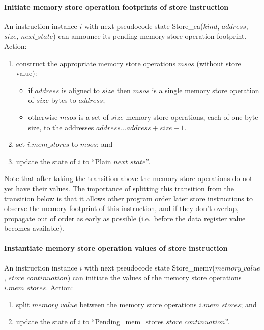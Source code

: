 \paragraph{Initiate memory store operation footprints of store instruction}\label{omm:announce_store_footprint}
An instruction instance $i$ with next pseudocode state {\sc Store\_ea}($kind$, $address$, $size$, $next\_state$) can announce its pending memory store operation footprint.
Action:
\begin{enumerate}
\item construct the appropriate memory store operations $msos$ (without store value):
  \begin{itemize}
  \item if $address$ is aligned to $size$ then $msos$ is a single memory store operation of $size$ bytes to $address$;
  \item otherwise $msos$ is a set of $size$ memory store operations, each of one byte size, to the addresses $address\ldots address+size-1$.
  \end{itemize}
\item set $i.mem\_stores$ to $msos$; and
\item update the state of $i$ to ``{\sc Plain} $next\_state$''.
\end{enumerate}

\begin{commentary}
Note that after taking the transition above the memory store operations do not yet have their values.
The importance of splitting this transition from the transition below is that it allows other program order later store instructions to observe the memory footprint of this instruction, and if they don't overlap, propagate out of order as early as possible (i.e.~before the data register value becomes available).
\end{commentary}


\paragraph{Instantiate memory store operation values of store instruction}\label{omm:initiate_store}
An instruction instance $i$ with next pseudocode state {\sc Store\_memv}($memory\_value$, $store\_continuation$) can initiate the values of the memory store operations $i.mem\_stores$.
Action:
\begin{enumerate}
\item split $memory\_value$ between the memory store operations $i.mem\_stores$; and
\item update the state of $i$ to ``{\sc Pending\_mem\_stores} $store\_continuation$''.
\end{enumerate}


